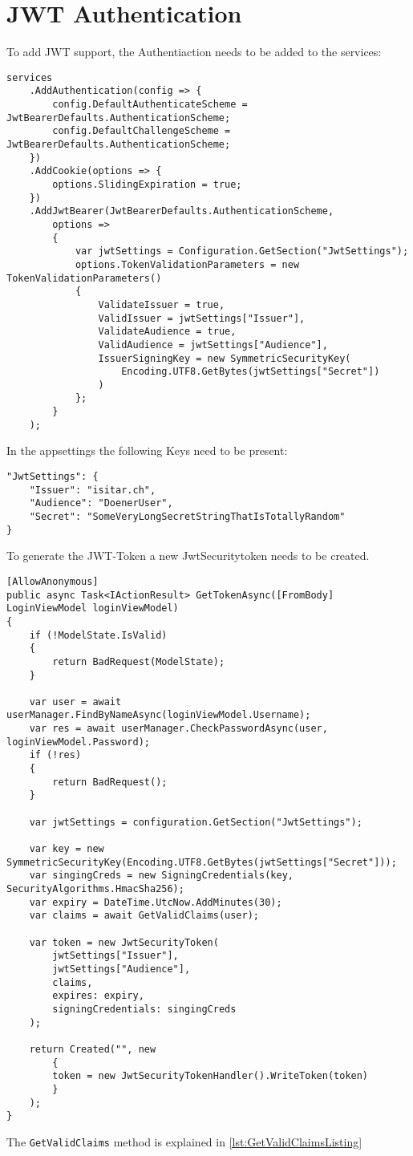 \documentclass[12pt, a4paper, parskip=half]{scrreprt}
\begin{document}
\section{JWT Authentication}
To add JWT support, the Authentiaction needs to be added to the services:

\begin{lstlisting}
services
	.AddAuthentication(config => {
		config.DefaultAuthenticateScheme = JwtBearerDefaults.AuthenticationScheme;
		config.DefaultChallengeScheme =	JwtBearerDefaults.AuthenticationScheme;
	})
	.AddCookie(options => {
		options.SlidingExpiration = true; 
	})
	.AddJwtBearer(JwtBearerDefaults.AuthenticationScheme,
		options =>
		{
			var jwtSettings = Configuration.GetSection("JwtSettings"); 
			options.TokenValidationParameters = new TokenValidationParameters()
			{
				ValidateIssuer = true,
				ValidIssuer = jwtSettings["Issuer"],
				ValidateAudience = true,
				ValidAudience = jwtSettings["Audience"],
				IssuerSigningKey = new SymmetricSecurityKey(
					Encoding.UTF8.GetBytes(jwtSettings["Secret"])
				)
			};
		}
	);
\end{lstlisting}
In the appsettings the following Keys need to be present:
\begin{lstlisting}
"JwtSettings": {
	"Issuer": "isitar.ch",
	"Audience": "DoenerUser",
	"Secret": "SomeVeryLongSecretStringThatIsTotallyRandom"
}
\end{lstlisting}

To generate the JWT-Token a new JwtSecuritytoken needs to be created.
\begin{lstlisting}
[AllowAnonymous]
public async Task<IActionResult> GetTokenAsync([FromBody] LoginViewModel loginViewModel)
{
	if (!ModelState.IsValid)
	{
		return BadRequest(ModelState);
	}
	
	var user = await userManager.FindByNameAsync(loginViewModel.Username);
	var res = await userManager.CheckPasswordAsync(user, loginViewModel.Password);
	if (!res)
	{
		return BadRequest();
	}
	
	var jwtSettings = configuration.GetSection("JwtSettings");
	
	var key = new SymmetricSecurityKey(Encoding.UTF8.GetBytes(jwtSettings["Secret"]));
	var singingCreds = new SigningCredentials(key, SecurityAlgorithms.HmacSha256);
	var expiry = DateTime.UtcNow.AddMinutes(30);
	var claims = await GetValidClaims(user);
	
	var token = new JwtSecurityToken(
		jwtSettings["Issuer"],
		jwtSettings["Audience"],
		claims,
		expires: expiry,
		signingCredentials: singingCreds
	);
	
	return Created("", new
		{
		token = new JwtSecurityTokenHandler().WriteToken(token)
		}
	);
}
\end{lstlisting}
The \lstinline|GetValidClaims| method is explained in \autoref{lst:GetValidClaimsListing} 
\end{document}
